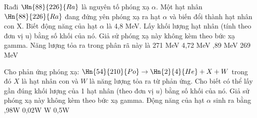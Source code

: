 \begin{vidu}%
 Rađi $\Hn{88}{226}{Ra}$ là nguyên tố phóng xạ $\alpha $. Một hạt nhân $\Hn{88}{226}{Ra}$ đang đứng yên phóng xạ ra hạt $\alpha $ và biến đổi thành hạt nhân con X. Biết động năng của hạt $\alpha $ là 4,8 MeV. Lấy khối lượng hạt nhân (tính theo đơn vị u) bằng số khối của nó. Giả sử phóng xạ này không kèm theo bức xạ gamma. Năng lượng tỏa ra trong phân rã này là
\choice
{271 MeV}
{4,72 MeV} 
{,89 MeV} 
{269 MeV}
\end{vidu}
\begin{vidu}%
Cho phản ứng phóng xạ: $\Hn{54}{210}{Po}\to \Hn{2}{4}{He}+X+W$ trong đó $X$ là hạt nhân con và $W$ là năng lượng tỏa ra từ phản ứng. Cho biết có thể lấy gần đúng khối lượng của 1 hạt nhân (theo đơn vị $u$) bằng số khối của nó. Giả sử phóng xạ này không kèm theo bức xạ gamma. Động năng của hạt $\alpha$ sinh ra bằng
\choice
{,98W}
{0,02W}
{W}
{0,5W}
\end{vidu}
